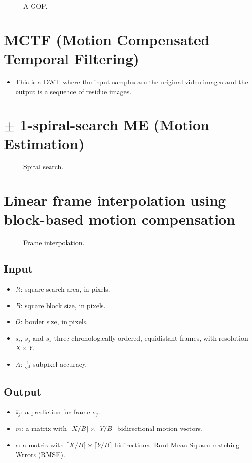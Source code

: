 \begin{figure}
  \caption{A GOP.}
  \label{fig:GOPs}
\end{figure}

\section{MCTF (Motion Compensated Temporal Filtering)}
\begin{itemize}
\tightlist
\item
  This is a DWT where the input samples are the original video images
  and the output is a sequence of residue images.
\end{itemize}

\section{$\pm$ 1-spiral-search ME (Motion Estimation)}
\begin{figure}[h]
  \caption{Spiral search.}
  \label{fig:spiral_search}
\end{figure}

\section{Linear frame interpolation using block-based motion compensation}
\label{sec:linear_frame_interpolation}
\begin{figure}[h]
  \caption{Frame interpolation.}
  \label{fig:frame_interpolation}
\end{figure}

\subsection*{Input}
\begin{itemize}
\tightlist
\item
  $R$: square search area, in pixels.
\item
  $B$: square block size, in pixels.
\item
  $O$: border size, in pixels.
\item
  $s_i$, $s_j$ and $s_k$ three chronologically ordered,
  equidistant frames, with resolution $X\times Y$.
\item
  $A$: $\frac{1}{2^A}$ subpixel accuracy.
\end{itemize}

\subsection*{Output}
\begin{itemize}
\tightlist
\item
  $\hat{s}_j$: a prediction for frame $s_j$.
\item
  $m$: a matrix with $\lceil X/B\rceil \times \lceil Y/B\rceil$
  bidirectional motion vectors.
\item
  $e$: a matrix with $\lceil X/B\rceil \times \lceil Y/B\rceil$
  bidirectional Root Mean Square matching Wrrors (RMSE).
\end{itemize}

